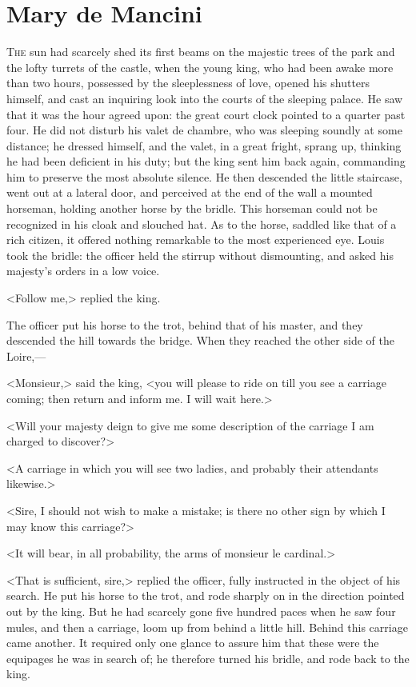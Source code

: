 \chapter{Mary de Mancini}

\lettrine{T}{he} sun had scarcely shed its first beams on the majestic trees of the park and the lofty turrets of the castle, when the young king, who had been awake more than two hours, possessed by the sleeplessness of love, opened his shutters himself, and cast an inquiring look into the courts of the sleeping palace. He saw that it was the hour agreed upon: the great court clock pointed to a quarter past four. He did not disturb his valet de chambre, who was sleeping soundly at some distance; he dressed himself, and the valet, in a great fright, sprang up, thinking he had been deficient in his duty; but the king sent him back again, commanding him to preserve the most absolute silence. He then descended the little staircase, went out at a lateral door, and perceived at the end of the wall a mounted horseman, holding another horse by the bridle. This horseman could not be recognized in his cloak and slouched hat. As to the horse, saddled like that of a rich citizen, it offered nothing remarkable to the most experienced eye. Louis took the bridle: the officer held the stirrup without dismounting, and asked his majesty's orders in a low voice.

<Follow me,> replied the king.

The officer put his horse to the trot, behind that of his master, and they descended the hill towards the bridge. When they reached the other side of the Loire,—

<Monsieur,> said the king, <you will please to ride on till you see a carriage coming; then return and inform me. I will wait here.>

<Will your majesty deign to give me some description of the carriage I am charged to discover?>

<A carriage in which you will see two ladies, and probably their attendants likewise.>

<Sire, I should not wish to make a mistake; is there no other sign by which I may know this carriage?>

<It will bear, in all probability, the arms of monsieur le cardinal.>

<That is sufficient, sire,> replied the officer, fully instructed in the object of his search. He put his horse to the trot, and rode sharply on in the direction pointed out by the king. But he had scarcely gone five hundred paces when he saw four mules, and then a carriage, loom up from behind a little hill. Behind this carriage came another. It required only one glance to assure him that these were the equipages he was in search of; he therefore turned his bridle, and rode back to the king.

